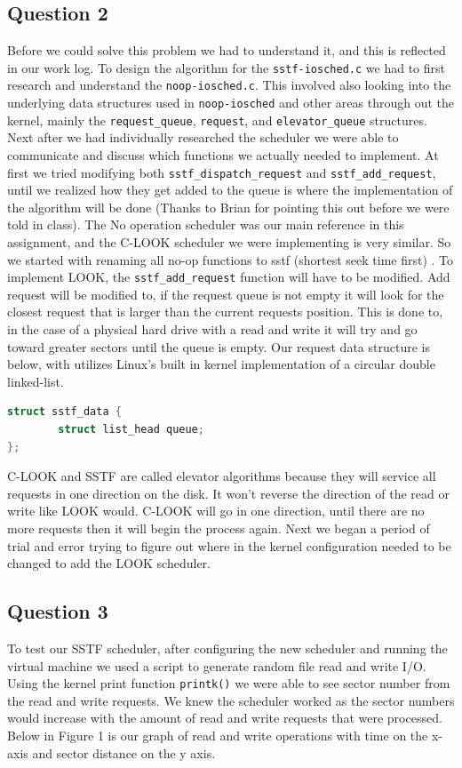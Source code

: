 \documentclass[10pt,draftclsnofoot,onecolumn, compsoc]{IEEEtran}
\begin{document}
\subsection{Question 2}
Before we could solve this problem we had to understand it, and this is reflected in our work log. To design the algorithm for the \texttt{sstf-iosched.c} we had to first research and understand the \texttt{noop-iosched.c}. This involved also looking into the underlying data structures used in \texttt{noop-iosched} and other areas through out the kernel, mainly the \texttt{request\_queue}, \texttt{request}, and \texttt{elevator\_queue} structures. Next after we had individually researched the scheduler we were able to communicate and discuss which functions we actually needed to implement. At first we tried modifying both \texttt{sstf\_dispatch\_request} and \texttt{sstf\_add\_request}, until we realized how they get added to the queue is where the implementation of the algorithm will be done (Thanks to Brian for pointing this out before we were told in class). The No operation scheduler was our main reference in this assignment, and the C-LOOK scheduler we were implementing is very similar. So we started with renaming all no-op functions to sstf (shortest seek time first) \cite{celis_gonzales_2014}. To implement LOOK, the \texttt{sstf\_add\_request} function will have to be modified. Add request will be modified to, if the request queue is not empty it will look for the closest request that is larger than the current requests position. This is done to, in the case of a physical hard drive with a read and write it will try and go toward greater sectors until the queue is empty. Our request data structure is below, with utilizes Linux's built in kernel implementation of a circular double linked-list.
\begin{lstlisting}[language=C, style=customc]
struct sstf_data {
        struct list_head queue;
};
\end{lstlisting}
C-LOOK and SSTF are called elevator algorithms because they will service all requests in one direction on the disk. It won't reverse the direction of the read or write like LOOK would. C-LOOK will go in one direction, until there are no more requests then it will begin the process again.
Next we began a period of trial and error trying to figure out where in the kernel configuration needed to be changed to add the LOOK scheduler.
\subsection{Question 3}
To test our SSTF scheduler, after configuring the new scheduler and running the virtual machine we used a script to generate random file read and write I/O. Using the kernel print function \texttt{printk()} we were able to see sector number from the read and write requests. We knew the scheduler worked as the sector numbers would increase with the amount of read and write requests that were processed. Below in Figure 1 is our graph of read and write operations with time on the x-axis and sector distance on the y axis.
\end{document}

